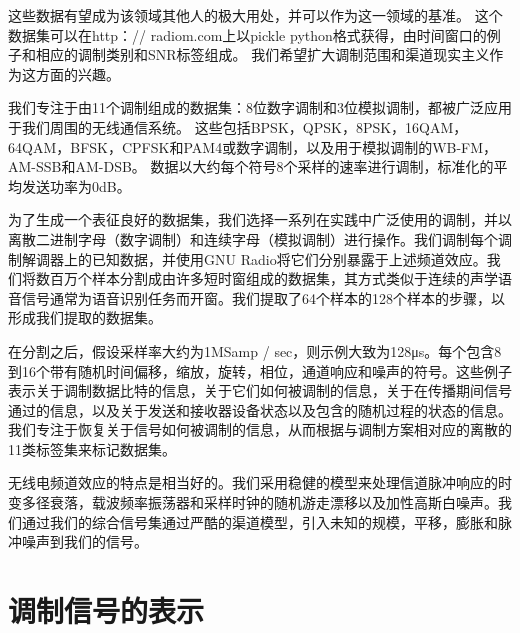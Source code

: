 这些数据有望成为该领域其他人的极大用处，并可以作为这一领域的基准。 这个数据集可以在http：// radiom.com上以pickle python格式获得，由时间窗口的例子和相应的调制类别和SNR标签组成。 我们希望扩大调制范围和渠道现实主义作为这方面的兴趣。\par

我们专注于由11个调制组成的数据集：8位数字调制和3位模拟调制，都被广泛应用于我们周围的无线通信系统。 这些包括BPSK，QPSK，8PSK，16QAM，64QAM，BFSK，CPFSK和PAM4或数字调制，以及用于模拟调制的WB-FM，AM-SSB和AM-DSB。 数据以大约每个符号8个采样的速率进行调制，标准化的平均发送功率为0dB。\par

为了生成一个表征良好的数据集，我们选择一系列在实践中广泛使用的调制，并以离散二进制字母（数字调制）和连续字母（模拟调制）进行操作。我们调制每个调制解调器上的已知数据，并使用GNU Radio将它们分别暴露于上述频道效应。我们将数百万个样本分割成由许多短时窗组成的数据集，其方式类似于连续的声学语音信号通常为语音识别任务而开窗。我们提取了64个样本的128个样本的步骤，以形成我们提取的数据集。\par

在分割之后，假设采样率大约为1MSamp / sec，则示例大致为128μs。每个包含8到16个带有随机时间偏移，缩放，旋转，相位，通道响应和噪声的符号。这些例子表示关于调制数据比特的信息，关于它们如何被调制的信息，关于在传播期间信号通过的信息，以及关于发送和接收器设备状态以及包含的随机过程的状态的信息。我们专注于恢复关于信号如何被调制的信息，从而根据与调制方案相对应的离散的11类标签集来标记数据集。\par


无线电频道效应的特点是相当好的。我们采用稳健的模型来处理信道脉冲响应的时变多径衰落，载波频率振荡器和采样时钟的随机游走漂移以及加性高斯白噪声。我们通过我们的综合信号集通过严酷的渠道模型，引入未知的规模，平移，膨胀和脉冲噪声到我们的信号。\par

\section{调制信号的表示}

